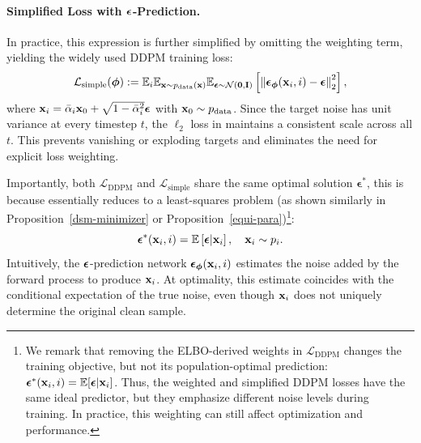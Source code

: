 \paragraph{Simplified Loss with ${\bm{\epsilon}}$-Prediction.}
In practice, this expression is further simplified by omitting the weighting term, yielding the widely used DDPM training loss:
\begin{equation}\label{eq:ddpm-simple-loss}
    \mathcal{L}_{\text{simple}}(\bm{\phi}) := \mathbb{E}_{i} \mathbb{E}_{{\mathbf{x}} \sim p_{\text{data}}({\mathbf{x}})} \mathbb{E}_{\boldsymbol{\epsilon} \sim \mathcal{N}(\mathbf{0}, \mathbf{I})} \left[ \left\| \boldsymbol{\epsilon}_{\bm{\phi}}({\mathbf{x}}_i, i) - \boldsymbol{\epsilon} \right\|_2^2 \right],
\end{equation}
where ${\mathbf{x}}_i = \bar{\alpha}_i {\mathbf{x}}_0 + \sqrt{1 - \bar{\alpha}_i^2} \boldsymbol{\epsilon}$ with ${\mathbf{x}}_0 \sim p_{\text{data}}$. Since the target noise has unit variance at every timestep $t$, the $\ell_2$ loss in  maintains a consistent scale across all $t$. This prevents vanishing or exploding targets and eliminates the need for explicit loss weighting.


Importantly, both $\mathcal{L}_{\text{DDPM}}$ and $\mathcal{L}_{\text{simple}}$ share the same optimal solution $\boldsymbol{\epsilon}^*$, this is because  essentially reduces to a least-squares problem (as shown similarly in Proposition~\ref{dsm-minimizer} or Proposition~\ref{equi-para})\footnote{We remark that removing the ELBO-derived weights in $\mathcal{L}_{\text{DDPM}}$ changes the training objective,
but not its population-optimal prediction: ${\bm{\epsilon}}^*({\mathbf{x}}_i,i)
=
\mathbb{E}[{\bm{\epsilon}}| {\mathbf{x}}_i]$.
Thus, the weighted and simplified DDPM losses have the same ideal predictor, but
they emphasize different noise levels during training. In practice, this weighting
can still affect optimization and performance.}:
\[
\boldsymbol{\epsilon}^*({\mathbf{x}}_i, i) = \mathbb{E}\left[ \boldsymbol{\epsilon}|{\mathbf{x}}_i \right], \quad {\mathbf{x}}_i \sim p_i.
\]
Intuitively, the ${\bm{\epsilon}}$-prediction network $\boldsymbol{\epsilon}_{\bm{\phi}}({\mathbf{x}}_i, i)$ estimates the noise added by the forward process to produce ${\mathbf{x}}_i$. At optimality, this estimate coincides with the conditional expectation of the true noise, even though ${\mathbf{x}}_i$ does not uniquely determine the original clean sample.


